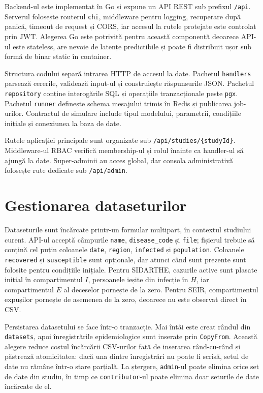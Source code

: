Backend-ul este implementat în Go și expune un API REST sub prefixul
\texttt{/api}. Serverul folosește routerul \texttt{chi}, middleware pentru
logging, recuperare după panică, timeout de request și CORS, iar accesul la rutele
protejate este controlat prin JWT. Alegerea Go este potrivită pentru această
componentă deoarece API-ul este stateless, are nevoie de latențe predictibile și
poate fi distribuit ușor sub formă de binar static în container.

Structura codului separă intrarea HTTP de accesul la date. Pachetul
\texttt{handlers} parsează cererile, validează input-ul și construiește
răspunsurile JSON. Pachetul \texttt{repository} conține interogările SQL și
operațiile tranzacționale peste \texttt{pgx}. Pachetul \texttt{runner} definește
schema mesajului trimis în Redis și publicarea job-urilor. Contractul de simulare
include tipul modelului, parametrii, condițiile inițiale și conexiunea la baza de
date.

Rutele aplicației principale sunt organizate sub
\texttt{/api/studies/\{studyId\}}. Middleware-ul RBAC verifică membership-ul și
rolul înainte ca handler-ul să ajungă la date. Super-adminii au acces global,
dar consola administrativă folosește rute dedicate sub \texttt{/api/admin}.

\section{Gestionarea dataseturilor}
\label{sec:dataseturi_web}

Dataseturile sunt încărcate printr-un formular multipart, în contextul studiului
curent. API-ul acceptă câmpurile \texttt{name}, \texttt{disease\_code} și
\texttt{file}; fișierul trebuie să conțină cel puțin coloanele \texttt{date},
\texttt{region}, \texttt{infected} și \texttt{population}. Coloanele
\texttt{recovered} și \texttt{susceptible} sunt opționale, dar atunci când sunt
prezente sunt folosite pentru condițiile inițiale. Pentru SIDARTHE, cazurile
active sunt plasate inițial în compartimentul $I$, persoanele ieșite din
infecție în $H$, iar compartimentul $E$ al deceselor pornește de la zero.
Pentru SEIR, compartimentul expușilor pornește de asemenea de la zero,
deoarece nu este observat direct în CSV.

Persistarea datasetului se face într-o tranzacție. Mai întâi este creat rândul din
\texttt{datasets}, apoi înregistrările epidemiologice sunt inserate prin
\texttt{CopyFrom}. Această alegere reduce costul încărcării CSV-urilor față de
inserarea rând-cu-rând și păstrează atomicitatea: dacă una dintre înregistrări nu
poate fi scrisă, setul de date nu rămâne într-o stare parțială. La ștergere,
\texttt{admin}-ul poate elimina orice set de date din studiu, în timp ce
\texttt{contributor}-ul poate elimina doar seturile de date încărcate de el.

